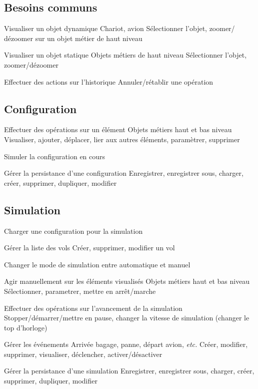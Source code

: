 \subsection{Besoins communs}
\nBesoin
{Visualiser un objet dynamique}
{Chariot, avion}
{Sélectionner l'objet, zoomer/ dézoomer sur un objet métier de haut niveau}

\nBesoin
{Visualiser un objet statique}
{Objets métiers de haut niveau}
{Sélectionner l'objet, zoomer/dézoomer}

\nBesoin
{Effectuer des actions sur l'historique}
{}
{Annuler/rétablir une opération}

\subsection{Configuration}
\setcounter{cntBesoins}{1}

\nBesoin
{Effectuer des opérations sur un élément}
{Objets métiers haut et bas niveau}
{Visualiser, ajouter, déplacer, lier aux autres éléments, paramètrer, supprimer}

\nBesoin
{Simuler la configuration en cours}
{}
{}

\nBesoin
{Gérer la persistance d'une configuration}
{}
{Enregistrer, enregistrer sous, charger, créer, supprimer, dupliquer, modifier}

\subsection{Simulation}
\setcounter{cntBesoins}{1}

\nBesoin
{Charger une configuration pour la simulation}
{}
{}

\nBesoin
{Gérer la liste des vols}
{}
{Créer, supprimer, modifier un vol}

\nBesoin
{Changer le mode de simulation entre automatique et manuel}
{}
{}

\nBesoin
{Agir manuellement sur les éléments visualisés}
{Objets métiers haut et bas niveau}
{Sélectionner, parametrer, mettre en arrêt/marche}

\nBesoin
{Effectuer des opérations sur l'avancement de la simulation}
{}
{Stopper/démarrer/mettre en pause, changer la vitesse de simulation (changer le top d'horloge)}

\nBesoin
{Gérer les événements}
{Arrivée bagage, panne, départ avion, \textsl{etc.}}
{Créer, modifier, supprimer, visualiser, déclencher, activer/désactiver}

\nBesoin
{Gérer la persistance d'une simulation}
{}
{Enregistrer, enregistrer sous, charger, créer, supprimer, dupliquer, modifier}

